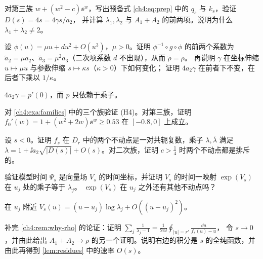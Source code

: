 \begin{exercise}\label{ch4:ex:expq-prep}
对第三族 $w+(w^2-c)\ee^w$，写出预备式 \eqref{ch4:eq:prep} 中的 $q_s$ 与 $k_s$，验证 $D(s)=4s=4\gamma s/a_2$，
并计算 $\lambda_1,\lambda_2$ 与 $A_1+A_2$ 的前两项。说明为什么 $\lambda_1+\lambda_2\ne2$。
\end{exercise}

\begin{exercise}\label{ch4:ex:rho-invariant}
设 $\phi(u)=\mu u+du^2+O(u^3)$，$\mu>0$。证明 $\phi^{-1}\circ g\circ\phi$ 的前两个系数为
$\tilde a_2=\mu a_2$、$\tilde a_3=\mu^2a_3$（二次项系数 $d$ 不出现），从而 $\tilde\rho=\rho$。
再说明 $\gamma$ 在坐标伸缩 $u\mapsto\mu u$ 与参数伸缩 $s\mapsto\kappa s$（$\kappa>0$）下如何变化；
证明 $4a_2\gamma$ 在前者下不变，在后者下乘以 $1/\kappa$。
\end{exercise}
\begin{hint}
$4a_2\gamma=p'(0)$，而 $p$ 只依赖于乘子。
\end{hint}

\begin{exercise}\label{ch4:ex:H4}
对 \cref{ch4:exa:families} 中的三个族验证 (H4)。对第三族，证明 $f_0'(w)=1+(w^2+2w)\ee^w\ge0.53$ 在 $[-0.8,0]$ 上成立。
\end{exercise}

\begin{exercise}\label{ch4:ex:lavaurs}
设 $s<0$。证明 $f_s$ 在 $D_r$ 中的两个不动点是一对共轭复数，乘子 $\lambda,\bar\lambda$ 满足
$\lambda=1+\ii a_2\sqrt{|D(s)|}+O(s)$。对二次族，证明 $c>\frac14$ 时两个不动点都是排斥的。
\end{exercise}

\begin{exercise}\label{ch4:ex:vector-field}
验证模型时间 $\Psi_s$ 是向量场 $V_s$ 的时间坐标，并证明 $V_s$ 的时间一映射 $\exp(V_s)$ 在 $u_j$ 处的乘子等于 $\lambda_j$。
$\exp(V_s)$ 在 $u_j$ 之外还有其他不动点吗？
\end{exercise}
\begin{hint}
在 $u_j$ 附近 $V_s(u)=(u-u_j)\log\lambda_j+O((u-u_j)^2)$。
\end{hint}

\begin{exercise}\label{ch4:ex:index}
补完 \cref{ch4:rem:why-rho} 的论证：证明 $\sum_j\frac1{\lambda_j-1}=\frac1{2\pi\ii}\oint_{|u|=r'}\frac{\dd u}{f_s(u)-u}$，
令 $s\to0$，并由此给出 $A_1+A_2\to\rho$ 的另一个证明。说明右边的积分是 $s$ 的全纯函数，并由此再得到 \cref{lem:residues} 中的速率 $O(s)$。
\end{exercise}

